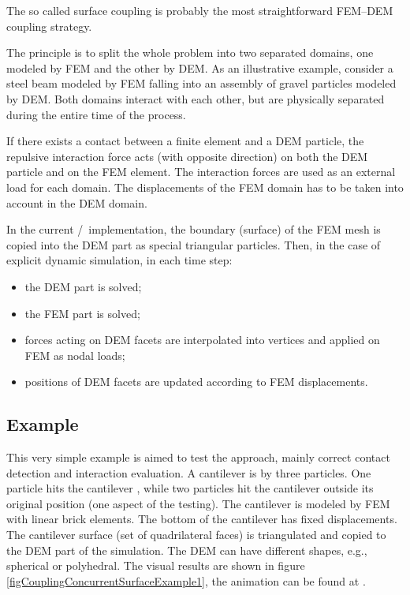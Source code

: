 The so called surface coupling
\cite{Munjiza2004a,OnateRojek2004a,VillardChevalierLeHelloCombe2009a,Fakhimi2009a,NakashimaOida2004a}
is probably the most straightforward FEM--DEM coupling strategy.

The principle is to split the whole problem into two separated domains, one modeled by FEM and the other by DEM.
As an illustrative example, consider a steel beam modeled by FEM falling into an assembly of gravel particles modeled by DEM.
Both domains interact with each other, but are physically separated during the entire time of the process.

If there exists a contact between a finite element and a DEM particle, the repulsive interaction force acts (with opposite direction) on both the DEM particle and on the FEM element.
The interaction forces are used as an external load for each domain.
The displacements of the FEM domain has to be taken into account in the DEM domain.

In the current \OOFEM/\YADE\ implementation, the boundary (surface) of the FEM mesh is copied into the DEM part as special triangular particles.
Then, in the case of explicit dynamic simulation, in each time step:
\begin{itemize}
	\item the DEM part is solved;
	\item the FEM part is solved;
	\item forces acting on DEM facets are interpolated into vertices and applied on FEM as nodal loads;
	\item positions of DEM facets are updated according to FEM displacements.
\end{itemize}


\subsection{Example}
This very simple example is aimed to test the approach, mainly correct contact detection and interaction evaluation.
A cantilever is  by three particles.
One particle hits the cantilever , while two particles hit the cantilever outside its original position (one aspect of the testing).
The cantilever is modeled by FEM with linear brick elements. The bottom of the cantilever has fixed displacements.
The cantilever surface (set of quadrilateral faces) is triangulated and copied to the DEM part of the simulation.
The DEM  can have different shapes, e.g., spherical or polyhedral.
The visual results are shown in figure \ref{figCouplingConcurrentSurfaceExample1}, the animation can be found at .







